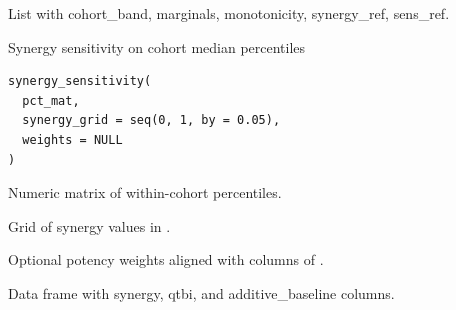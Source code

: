 \documentclass[a4paper]{book}
\begin{document}
%
\begin{Value}
List with cohort\_band, marginals, monotonicity, synergy\_ref, sens\_ref.
\end{Value}
%
\begin{Description}
Synergy sensitivity on cohort median percentiles
\end{Description}
%
\begin{Usage}
\begin{verbatim}
synergy_sensitivity(
  pct_mat,
  synergy_grid = seq(0, 1, by = 0.05),
  weights = NULL
)
\end{verbatim}
\end{Usage}
%
\begin{Arguments}
\begin{ldescription}
\item[\code{pct\_mat}] Numeric matrix of within-cohort percentiles.

\item[\code{synergy\_grid}] Grid of synergy values in \AsIs{\texttt{[0, 1]}}.

\item[\code{weights}] Optional potency weights aligned with columns of .
\end{ldescription}
\end{Arguments}
%
\begin{Value}
Data frame with synergy, qtbi, and additive\_baseline columns.
\end{Value}
\printindex{}
\end{document}
